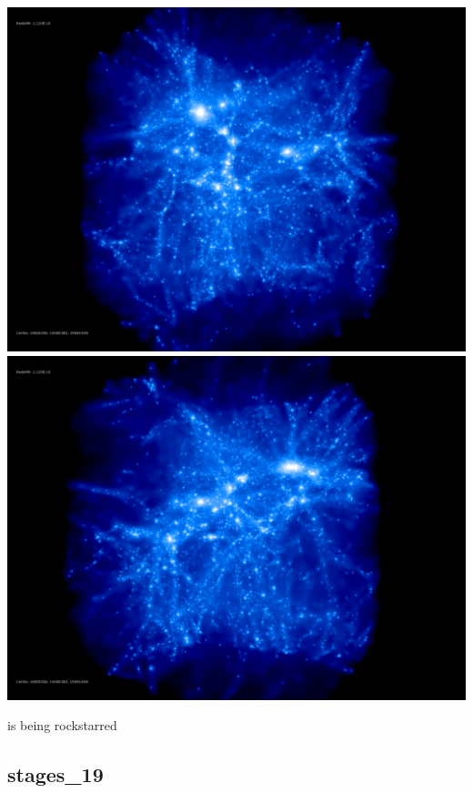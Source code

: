 \includegraphics[scale=0.1]{stages_18/rotate_00074.jpg} 
\includegraphics[scale=0.1]{stages_18/rotate_00131.jpg}

is being rockstarred  \\

% 
%
%
%
%
%
%
%

\newpage
\subsection{stages\_19}

